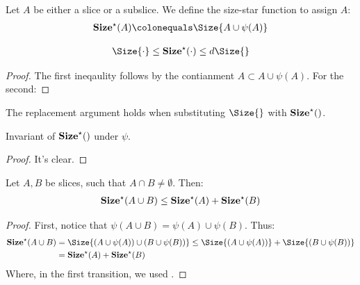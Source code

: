 \begin{definition}
Let $A$ be either a slice or a subslice. We define the size-star function to assign $A$:
\begin{equation*}
  \begin{split}
    \Sizestar{A} \colonequals \Size{ A \cup \psi(A)  } 
  \end{split}
\end{equation*}
\end{definition}



\begin{claim}
  \begin{equation*}
    \begin{split}
     \Size{ \cdot } \le \Sizestar{  \cdot  } \le d \Size{ } 
    \end{split}
  \end{equation*}
\end{claim}
\begin{proof}
  The first ineqaulity follows by the contianment $A \subset A \cup \psi(A)$.  For the second: 
\end{proof}




\begin{claim}
  The replacement argument holds when substituting $\Size{ }$ with $\mathbf{Size}^{\star}(   )$. 
\end{claim}

\begin{claim}
   Invariant of $\mathbf{Size}^{\star}(  )$ under $\psi$. 
\end{claim}
\begin{proof}
  It's clear.  
\end{proof}

\begin{claim}
  \label{claim:modifitringinq}
Let $A, B$ be slices, such that $A \cap B \neq \emptyset$. Then:
  \begin{equation*}
    \begin{split}
      \mathbf{Size}^{\star}( A\cup B ) \le \mathbf{Size}^{\star}( A ) + \mathbf{Size}^{\star}( B ) 
    \end{split}
  \end{equation*}
\end{claim}
\begin{proof}
First, notice that $\psi(A \cup B) = \psi(A) \cup \psi(B)$. Thus:
  \begin{equation*}
    \begin{split}
    \Sizestar{A\cup B} & =  \Size{ (A \cup \psi(A)) \cup  (B \cup \psi(B)) } \le   \Size{ (A \cup \psi(A)) } +  \Size{(B \cup \psi(B)) } \\
      & = \Sizestar{A} + \Sizestar{B} 
    \end{split}
  \end{equation*}
Where, in the first transition, we used .
\end{proof}


